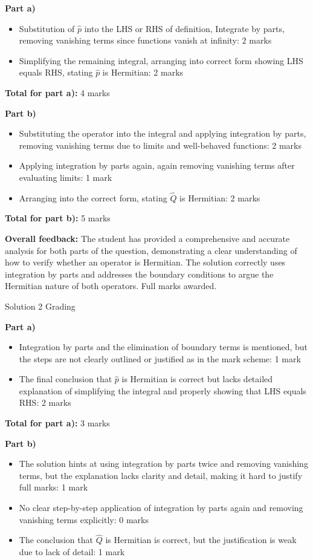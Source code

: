 \documentclass[a4paper,11pt]{article}
\begin{document}
\textbf{Part a)}
\begin{itemize}
    \item Substitution of \( \hat{p} \) into the LHS or RHS of definition, Integrate by parts, removing vanishing terms since functions vanish at infinity: 2 marks
    \item Simplifying the remaining integral, arranging into correct form showing LHS equals RHS, stating \( \hat{p} \) is Hermitian: 2 marks
\end{itemize}

\textbf{Total for part a):} 4 marks

\textbf{Part b)}
\begin{itemize}
    \item Substituting the operator into the integral and applying integration by parts, removing vanishing terms due to limits and well-behaved functions: 2 marks
    \item Applying integration by parts again, again removing vanishing terms after evaluating limits: 1 mark
    \item Arranging into the correct form, stating \(\hat{Q}\) is Hermitian: 2 marks
\end{itemize}

\textbf{Total for part b):} 5 marks

\textbf{Overall feedback:} The student has provided a comprehensive and accurate analysis for both parts of the question, demonstrating a clear understanding of how to verify whether an operator is Hermitian. The solution correctly uses integration by parts and addresses the boundary conditions to argue the Hermitian nature of both operators. Full marks awarded.

Solution 2 Grading

\textbf{Part a)}
\begin{itemize}
    \item Integration by parts and the elimination of boundary terms is mentioned, but the steps are not clearly outlined or justified as in the mark scheme: 1 mark
    \item The final conclusion that \( \hat{p} \) is Hermitian is correct but lacks detailed explanation of simplifying the integral and properly showing that LHS equals RHS: 2 marks
\end{itemize}

\textbf{Total for part a):} 3 marks

\textbf{Part b)}
\begin{itemize}
    \item The solution hints at using integration by parts twice and removing vanishing terms, but the explanation lacks clarity and detail, making it hard to justify full marks: 1 mark
    \item No clear step-by-step application of integration by parts again and removing vanishing terms explicitly: 0 marks
    \item The conclusion that \( \hat{Q} \) is Hermitian is correct, but the justification is weak due to lack of detail: 1 mark
\end{itemize}
\end{document}
